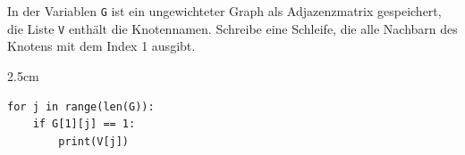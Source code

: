 \question[3]
In der Variablen \texttt{G} ist ein ungewichteter Graph als Adjazenzmatrix gespeichert, die Liste \texttt{V} enthält die Knotennamen. Schreibe eine Schleife, die alle Nachbarn des Knotens mit dem Index 1 ausgibt.
\begin{solutionbox}{2.5cm}
\begin{lstlisting}
for j in range(len(G)):
    if G[1][j] == 1:
        print(V[j])
\end{lstlisting}
\end{solutionbox}
